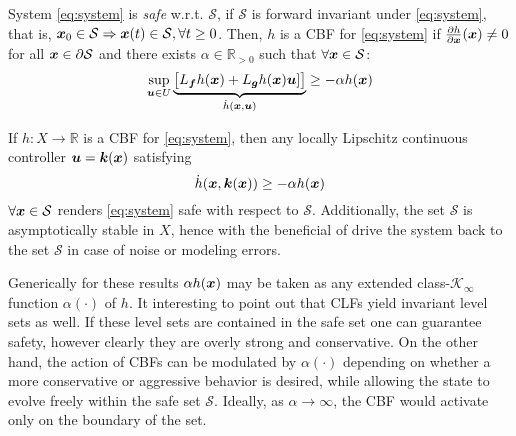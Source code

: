 \begin{definition} System \eqref{eq:system} is \textit{safe} w.r.t. $\mathcal{S}$, if $\mathcal{S}$ is forward invariant under \eqref{eq:system}, that is, $\boldsymbol{x}_0\in\mathcal{S}\Rightarrow \boldsymbol{x}(t)\in\mathcal{S}, \forall t\geq0$.
Then, $h$ is a CBF for \eqref{eq:system} if $\frac{\partial{h}}{\partial \boldsymbol{x}} (\boldsymbol{x})\neq 0$ for all $\boldsymbol{x}\in \partial{\mathcal{S}}$ and there exists $\alpha \in \mathbb{R}_{>0}$ such that $\forall \boldsymbol{x} \in \mathcal{S}$: 
\begin{equation}
\sup_{\boldsymbol{u}\in U} \underbrace{ 
\begin{bmatrix}
L_{\boldsymbol{f}}h(\boldsymbol{x}) + L_{\boldsymbol{g}}h(\boldsymbol{x})\boldsymbol{u}] 
\end{bmatrix}}_{\dot{h}(\boldsymbol{x},\boldsymbol{u})}\geq -\alpha h(\boldsymbol{x})
\end{equation}


\begin{theorem}
    \label{th:cbf}If $h : X \to \mathbb{R}$ is a CBF for \eqref{eq:system}, then any locally Lipschitz continuous controller $\boldsymbol{u} = \boldsymbol{k}(\boldsymbol{x})$ satisfying
\begin{equation}
\dot{h}(\boldsymbol{x},\boldsymbol{k}(\boldsymbol{x}))\geq -\alpha h(\boldsymbol{x})
\label{cond:2}
\end{equation}
$\forall{\boldsymbol{x}}\in\mathcal{S}$ renders \eqref{eq:system} safe with respect to $\mathcal{S}$. Additionally, the set $\mathcal{S}$ is asymptotically stable in $X$, hence with the beneficial of drive the system back to the set $\mathcal{S}$ in case of noise or modeling errors.
\end{theorem}
\end{definition}
\noindent
Generically for these results $\alpha h(\boldsymbol{x})$ may be taken as any extended class-$\mathcal{K}_{\infty}$ function $\alpha(\cdot)$ of $h$.
It interesting to point out that CLFs yield invariant level sets as well. If these level sets are contained in the safe set one can guarantee safety, however clearly they are overly strong and conservative. On the other hand, the action of CBFs can be modulated by $\alpha(\cdot)$ depending on whether a more conservative or aggressive behavior is desired, while allowing the state to evolve freely within the safe set $\mathcal{S}$. Ideally, as $\alpha \to \infty$, the CBF would activate only on the boundary of the set.


